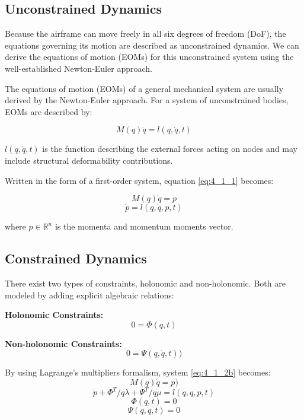 \subsection{Unconstrained Dynamics}
Because the airframe can move freely in all six degrees of freedom (DoF), the equations governing its motion are described as unconstrained dynamics. We can derive the equations of motion (EOMs) for this unconstrained system using the well-established Newton-Euler approach.

The equations of motion (EOMs) of a general mechanical system are usually derived by the Newton-Euler approach. For a system of unconstrained bodies, EOMs are described by:

\begin{equation}
     M(q) \ddot{q} = l(q, \dot{q}, t)  \label{eq:4_1_1}
\end{equation}

\( l(q, \dot{q}, t) \) is the function describing the external forces acting on nodes and may include structural deformability contributions.

Written in the form of a first-order system, equation \ref{eq:4_1_1} becomes:

\begin{equation}
    M(q) \dot{q} = p \label{eq:4_1_2a}
\end{equation}
\begin{equation}
    \dot{p} = l(q, \dot{q}, p, t) \label{eq:4_1_2b}
\end{equation}

where \( p \in \mathbb{R}^n \) is the momenta and momentum moments vector.

\subsection{Constrained Dynamics}

There exist two types of constraints, holonomic and non-holonomic. Both are modeled by adding explicit algebraic relations:

\textbf{Holonomic Constraints:}
\begin{equation}
    0 = \Phi(q, t) \label{eq:4.1.3}
\end{equation}

\textbf{Non-holonomic Constraints:}
\begin{equation}
    0 = \Psi(q, \dot{q}, t)) \label{eq:4.1.4}
\end{equation}

By using Lagrange’s multipliers formalism, system \ref{eq:4_1_2b} becomes:
\begin{equation}
    M(q) \dot{q} = p ) \label{eq:4.1.5a}
\end{equation}
\begin{equation}
    \dot{p} + \Phi^T/q\lambda + \Psi^T/\dot{q}\mu = l(q, \dot{q}, p, t) \label{eq:4.1.5b}
\end{equation}
\begin{equation}
    \Phi(q, t) = 0 \label{eq:4.1.5c}
\end{equation}
\begin{equation}
    \Psi(q, \dot{q}, t) = 0 \label{eq:4.1.5d}
\end{equation}


